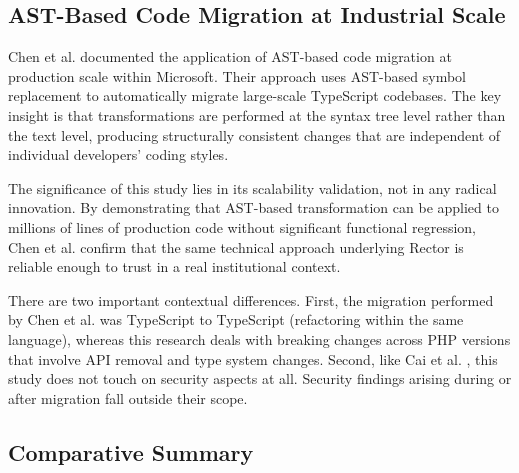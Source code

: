 \subsection{AST-Based Code Migration at Industrial Scale}

Chen et al. \cite{chen2022ast} documented the application of AST-based code migration at production scale within Microsoft. Their approach uses AST-based symbol replacement to automatically migrate large-scale TypeScript codebases. The key insight is that transformations are performed at the syntax tree level rather than the text level, producing structurally consistent changes that are independent of individual developers' coding styles.

The significance of this study lies in its scalability validation, not in any radical innovation. By demonstrating that AST-based transformation can be applied to millions of lines of production code without significant functional regression, Chen et al. confirm that the same technical approach underlying Rector is reliable enough to trust in a real institutional context.

There are two important contextual differences. First, the migration performed by Chen et al. was TypeScript to TypeScript (refactoring within the same language), whereas this research deals with breaking changes across PHP versions that involve API removal and type system changes. Second, like Cai et al. \cite{cai2015pattern}, this study does not touch on security aspects at all. Security findings arising during or after migration fall outside their scope.

\newpage
\subsection{Comparative Summary}

